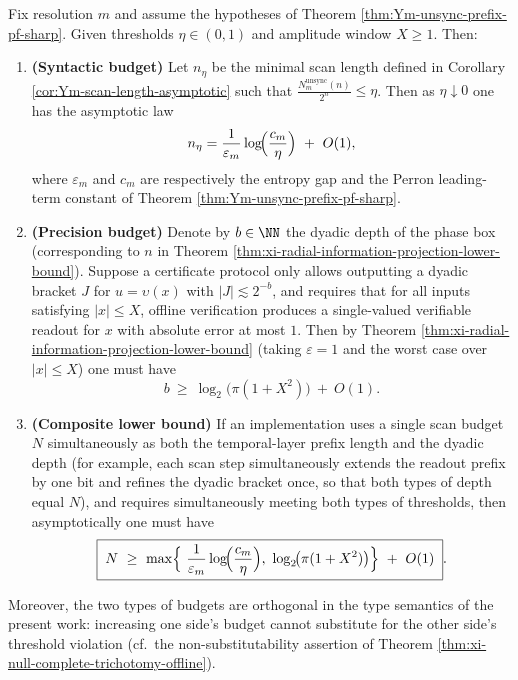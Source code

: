 \begin{corollary}\label{cor:xi-legal-readout-prefix-double-budget}
Fix resolution \(m\) and assume the hypotheses of Theorem \ref{thm:Ym-unsync-prefix-pf-sharp}.
Given thresholds \(\eta\in(0,1)\) and amplitude window \(X\ge 1\).
Then:
\begin{enumerate}
  \item \textbf{(Syntactic budget)}
  Let \(n_{\eta}\) be the minimal scan length defined in Corollary \ref{cor:Ym-scan-length-asymptotic} such that
  \(\frac{N_m^{\mathrm{unsync}}(n)}{2^n}\le \eta\).
  Then as \(\eta\downarrow 0\) one has the asymptotic law
  \[
  n_{\eta}
  =\frac{1}{\varepsilon_m}\log\!\Bigl(\frac{c_m}{\eta}\Bigr)\ +\ O(1),
  \]
  where \(\varepsilon_m\) and \(c_m\) are respectively the entropy gap and the Perron leading-term constant of Theorem \ref{thm:Ym-unsync-prefix-pf-sharp}.
  \item \textbf{(Precision budget)}
  Denote by \(b\in\NN\) the dyadic depth of the phase box (corresponding to \(n\) in Theorem \ref{thm:xi-radial-information-projection-lower-bound}).
  Suppose a certificate protocol only allows outputting a dyadic bracket \(J\) for \(u=\upsilon(x)\) with \(|J|\lesssim 2^{-b}\), and requires that for all inputs satisfying \(|x|\le X\), offline verification produces a single-valued verifiable readout for \(x\) with absolute error at most \(1\).
  Then by Theorem \ref{thm:xi-radial-information-projection-lower-bound} (taking \(\varepsilon=1\) and the worst case over \(|x|\le X\)) one must have
  \[
  b\ \ge\ \log_2\!\bigl(\pi(1+X^2)\bigr)\ +\ O(1).
  \]
  \item \textbf{(Composite lower bound)}
  If an implementation uses a single scan budget \(N\) simultaneously as both the temporal-layer prefix length and the dyadic depth (for example, each scan step simultaneously extends the readout prefix by one bit and refines the dyadic bracket once, so that both types of depth equal \(N\)), and requires simultaneously meeting both types of thresholds,
  then asymptotically one must have
  \begin{equation}\label{eq:xi-legal-readout-prefix-max-budget}
  \boxed{\;
  N\ \ge\ \max\Bigl\{\ \frac{1}{\varepsilon_m}\log\!\Bigl(\frac{c_m}{\eta}\Bigr),\ \log_2\!\bigl(\pi(1+X^2)\bigr)\Bigr\}\ +\ O(1)\; }.
  \end{equation}
\end{enumerate}
Moreover, the two types of budgets are orthogonal in the type semantics of the present work: increasing one side's budget cannot substitute for the other side's threshold violation (cf.\ the non-substitutability assertion of Theorem \ref{thm:xi-null-complete-trichotomy-offline}).
\end{corollary}

